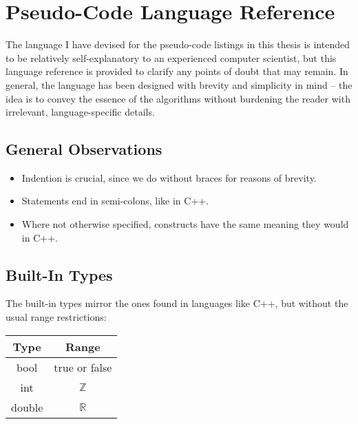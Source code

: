 \chapter{Pseudo-Code Language Reference}
\label{chap:appendixlang}

The language I have devised for the pseudo-code listings in this thesis is intended to be relatively self-explanatory to an experienced computer scientist, but this language reference is provided to clarify any points of doubt that may remain. In general, the language has been designed with brevity and simplicity in mind -- the idea is to convey the essence of the algorithms without burdening the reader with irrelevant, language-specific details.

\section{General Observations}

\begin{itemize}
\item Indention is crucial, since we do without braces for reasons of brevity.
\item Statements end in semi-colons, like in C++.
\item Where not otherwise specified, constructs have the same meaning they would in C++.
\end{itemize}

\section{Built-In Types}

The built-in types mirror the ones found in languages like C++, but without the usual range restrictions:

\begin{center}
\begin{tabular}{c|c}
\textbf{Type} & \textbf{Range} \\
\hline
bool & true or false \\
int & $\mathbb{Z}$ \\
double & $\mathbb{R}$
\end{tabular}
\end{center}

